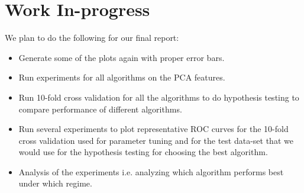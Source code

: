 \documentclass[10pt]{scrartcl}
\begin{document}
\section*{Work In-progress}
We plan to do the following for our final report:
\begin{itemize}
\item Generate some of the plots again with proper error bars. 
\item Run experiments for all algorithms on the PCA features. 
\item Run 10-fold cross validation for all the algorithms to do hypothesis testing to compare performance of different algorithms.
\item Run several experiments to plot representative ROC curves for the 10-fold cross validation used for parameter tuning and for the test data-set that we would use for the hypothesis testing for choosing the best algorithm.
\item Analysis of the experiments i.e. analyzing which algorithm performs best under which regime.
\end{itemize} 
\end{document}
